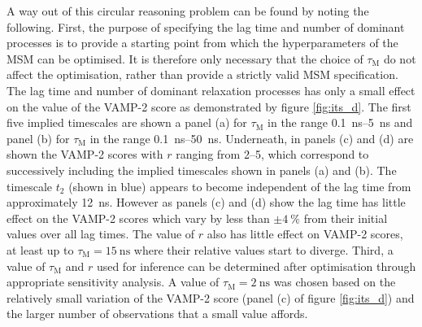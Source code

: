 A way out of this circular reasoning problem can be found by noting the following. First, the purpose of specifying the lag time and number of dominant processes is to provide a starting point from which the hyperparameters of the MSM can be optimised. It is therefore only necessary that the choice of $\tau_{\mathrm{M}}$ do not affect the optimisation, rather than provide a strictly valid MSM specification. The lag time and number of dominant relaxation processes has only a small effect on the value of the VAMP-2 score as demonstrated by figure \ref{fig:its_d}. The first five implied timescales are shown a panel (a)  for $\tau_{\mathrm{M}}$ in the range \SIrange{0.1}{5}{\nano\second} and panel (b) for $\tau_{\mathrm{M}}$ in the range \SIrange{0.1}{50}{\nano\second}. Underneath, in panels (c) and (d) are shown the VAMP-2 scores with $r$ ranging from \numrange{2}{5}, which correspond to successively including the implied timescales shown in panels (a) and (b). The timescale $t_{2}$ (shown in blue) appears to become independent of the lag time from approximately \SI{12}{\nano\second}. However as panels (c) and (d) show the lag time has little effect on the VAMP-2 scores which vary by less than $\pm\SI{4}{\percent}$ from their initial values over all lag times. The value of $r$ also has little effect on VAMP-2 scores, at least up to $\tau_{\mathrm{M}}=\SI{15}{\nano\second}$ where their relative values start to diverge. Third, a value of $\tau_{\mathrm{M}}$ and $r$ used for inference can be determined after optimisation through appropriate sensitivity analysis. A value of $\tau_{\mathrm{M}}=\SI{2}{\nano\second}$ was chosen based on the relatively small variation of the VAMP-2 score (panel (c) of figure \ref{fig:its_d}) and the larger number of observations that a small value affords. 

